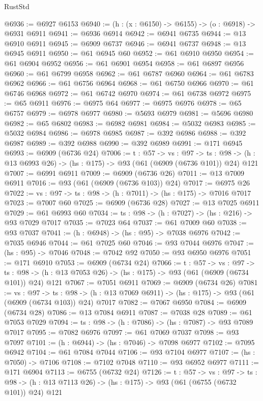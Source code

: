 \begin{lexlean}{RustStd}
\begin{coremodule}
@6936 := @6927 @6153
@6940 := (h : (x : @6150) -> @6155) -> (o : @6918) -> @6931 @6911
@6941 := @6936 @6914
@6942 := @6941 @6735
@6944 := @13 @6910 @6911
@6945 := @6909 @6737
@6946 := @6941 @6737
@6948 := @13 @6945 @6911
@6950 := @61 @6945 @60
@6952 := @61 @6910 @6950
@6954 := @61 @6904 @6952
@6956 := @61 @6901 @6954
@6958 := @61 @6897 @6956
@6960 := @61 @6799 @6958
@6962 := @61 @6787 @6960
@6964 := @61 @6783 @6962
@6966 := @61 @6756 @6964
@6968 := @61 @6750 @6966
@6970 := @61 @6746 @6968
@6972 := @61 @6742 @6970
@6974 := @61 @6738 @6972
@6975 := @65 @6911
@6976 := @6975 @64
@6977 := @6975 @6976
@6978 := @65 @6757
@6979 := @6978 @6977
@6980 := @5693 @6979
@6981 := @5696 @6980
@6982 := @65 @6802
@6983 := @6982 @6981
@6984 := @5032 @6983
@6985 := @5032 @6984
@6986 := @6978 @6985
@6987 := @392 @6986
@6988 := @392 @6987
@6989 := @392 @6988
@6990 := @392 @6989
@6991 := @171 @6945
@6993 := @6909 (@6736 @24)
@7006 := {t : @57} ->
  {vs : @97} ->
  {ts : @98} -> (h : @13 @6993 @26) -> (hs : @175) -> @93 (@61 (@6909 (@6736 @101)) @24) @121
@7007 := @6991 @6911
@7009 := @6909 (@6736 @26)
@7011 := @13 @7009 @6911
@7016 := @93 (@61 (@6909 (@6736 @103)) @24)
@7017 := @6975 @26
@7022 := {vs : @97} -> {ts : @98} -> (h : @7011) -> (hs : @175) -> @7016 @7017
@7023 := @7007 @60
@7025 := @6909 (@6736 @28)
@7027 := @13 @7025 @6911
@7029 := @61 @6993 @60
@7034 := {ts : @98} -> (h : @7027) -> (hs : @216) -> @93 @7029 @7017
@7035 := @7023 @64
@7037 := @61 @7009 @60
@7038 := @93 @7037
@7041 := (h : @6948) -> (hs : @95) -> @7038 @6976
@7042 := @7035 @6946
@7044 := @61 @7025 @60
@7046 := @93 @7044 @6976
@7047 := (hs : @95) -> @7046
@7048 := @7042 @92
@7050 := @93 @6950 @6976
@7051 := @171 @6910
@7053 := @6909 (@6734 @24)
@7066 := {t : @57} ->
  {vs : @97} ->
  {ts : @98} -> (h : @13 @7053 @26) -> (hs : @175) -> @93 (@61 (@6909 (@6734 @101)) @24) @121
@7067 := @7051 @6911
@7069 := @6909 (@6734 @26)
@7081 := {vs : @97} ->
  {ts : @98} -> (h : @13 @7069 @6911) -> (hs : @175) -> @93 (@61 (@6909 (@6734 @103)) @24) @7017
@7082 := @7067 @6950
@7084 := @6909 (@6734 @28)
@7086 := @13 @7084 @6911
@7087 := @7038 @28
@7089 := @61 @7053 @7029
@7094 := {ts : @98} -> (h : @7086) -> (hs : @7087) -> @93 @7089 @7017
@7095 := @7082 @6976
@7097 := @61 @7069 @7037
@7098 := @93 @7097
@7101 := (h : @6944) -> (hs : @7046) -> @7098 @6977
@7102 := @7095 @6942
@7104 := @61 @7084 @7044
@7106 := @93 @7104 @6977
@7107 := (hs : @7050) -> @7106
@7108 := @7102 @7048
@7110 := @93 @6952 @6977
@7111 := @171 @6904
@7113 := @6755 (@6732 @24)
@7126 := {t : @57} ->
  {vs : @97} ->
  {ts : @98} -> (h : @13 @7113 @26) -> (hs : @175) -> @93 (@61 (@6755 (@6732 @101)) @24) @121

\end{coremodule}
\end{lexlean}
